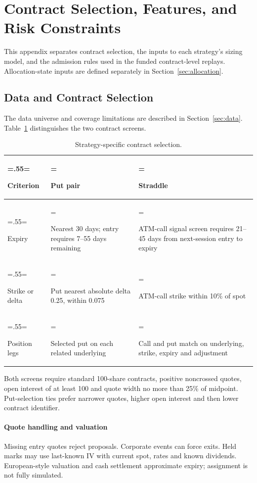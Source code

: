 \clearpage
\section{Contract Selection, Features, and Risk Constraints}\label{app:a}

This appendix separates contract selection, the inputs to each strategy's sizing model, and the admission rules used in the funded contract-level replays. Allocation-state inputs are defined separately in Section~\ref{sec:allocation}.

\subsection{Data and Contract Selection}\label{app:contracts}

The data universe and coverage limitations are described in Section~\ref{sec:data}. Table~\ref{tab:contract-selection} distinguishes the two contract screens.

\begin{table}[H]\centering\small
\caption{Strategy-specific contract selection.}\label{tab:contract-selection}
\setlength{\tabcolsep}{5pt}\renewcommand{\arraystretch}{1.2}
\begin{tabularx}{\textwidth}{@{}>{\hsize=.55\hsize\linewidth=\hsize\raggedright\arraybackslash}X>{\hsize=1.225\hsize\linewidth=\hsize\raggedright\arraybackslash}X>{\hsize=1.225\hsize\linewidth=\hsize\raggedright\arraybackslash}X@{}}\toprule
\textbf{Criterion} & \textbf{Put pair} & \textbf{Straddle}\\\midrule
Expiry & Nearest 30 days; entry requires 7--55 days remaining & ATM-call signal screen requires 21--45 days from next-session entry to expiry\\[4pt]
Strike or delta & Put nearest absolute delta 0.25, within 0.075 & ATM-call strike within 10\% of spot\\[4pt]
Position legs & Selected put on each related underlying & Call and put match on underlying, strike, expiry and adjustment\\
\bottomrule\end{tabularx}\end{table}

Both screens require standard 100-share contracts, positive noncrossed quotes, open interest of at least 100 and quote width no more than 25\% of midpoint. Put-selection ties prefer narrower quotes, higher open interest and then lower contract identifier.

\paragraph{Quote handling and valuation}
Missing entry quotes reject proposals. Corporate events can force exits. Held marks may use last-known IV with current spot, rates and known dividends. European-style valuation and cash settlement approximate expiry; assignment is not fully simulated.

